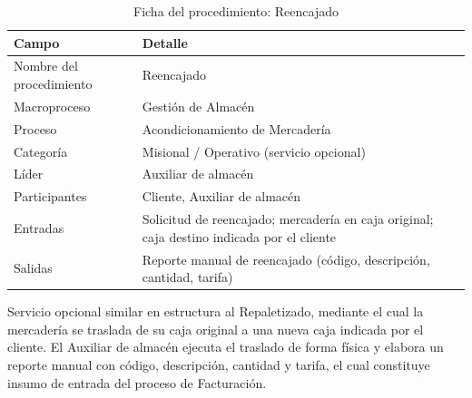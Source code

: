\documentclass[11pt, a4paper, oneside]{report}
\begin{document}
\begin{table}[H]
\centering\small
\renewcommand{\arraystretch}{1.25}
\setlength{\tabcolsep}{6pt}
\begin{tabularx}{\textwidth}{|>{\raggedright\arraybackslash}p{}|>{\raggedright\arraybackslash}X|}
\hline
\rowcolor{upeu_mid}
\color{white}\bfseries Campo & \color{white}\bfseries Detalle \\ \hline
\rowcolor{gray!10}
Nombre del procedimiento & Reencajado \\ \hline
\rowcolor{gray!10}
Macroproceso & Gestión de Almacén \\ \hline
Proceso & Acondicionamiento de Mercadería \\ \hline
\rowcolor{gray!10}
Categoría & Misional / Operativo (servicio opcional) \\ \hline
Líder & Auxiliar de almacén \\ \hline
\rowcolor{gray!10}
Participantes & Cliente, Auxiliar de almacén \\ \hline
Entradas & Solicitud de reencajado; mercadería en caja original; caja destino indicada por el cliente \\ \hline
\rowcolor{gray!10}
Salidas & Reporte manual de reencajado (código, descripción, cantidad, tarifa) \\ \hline
\end{tabularx}
\caption{Ficha del procedimiento: Reencajado}
\end{table}

Servicio opcional similar en estructura al Repaletizado, mediante el cual la mercadería se traslada de su caja original a una nueva caja indicada por el cliente. El Auxiliar de almacén ejecuta el traslado de forma física y elabora un reporte manual con código, descripción, cantidad y tarifa, el cual constituye insumo de entrada del proceso de Facturación.
\end{document}
